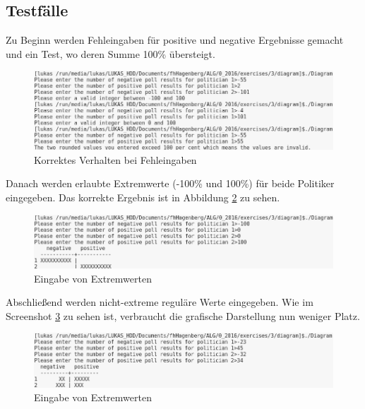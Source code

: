 \documentclass[a4paper]{article}
\begin{document}
\begin{enumerate}
		\section*{Testfälle}
		Zu Beginn werden Fehleingaben für positive und negative Ergebnisse gemacht und ein Test, wo deren Summe 100\% übersteigt.
		\begin{center}
			\begin{figure}[ht!]
				\includegraphics[scale=0.40]{diagram/tests/invalidInputs.png}
				\caption{Korrektes Verhalten bei Fehleingaben}
				\label{diagramInvalidInputs}
			\end{figure}
		\end{center}
		
		\clearpage
		Danach werden erlaubte Extremwerte (-100\% und 100\%) für beide Politiker eingegeben. Das korrekte Ergebnis ist in Abbildung \ref{diagramExtremeValues} zu sehen.
		\begin{center}
			\begin{figure}[ht!]
				\includegraphics[scale=0.40]{diagram/tests/extremeValues.png}
				\caption{Eingabe von Extremwerten}
				\label{diagramExtremeValues}
			\end{figure}
		\end{center}
		
		Abschließend werden nicht-extreme reguläre Werte eingegeben. Wie im Screenshot \ref{diagramRegularValues} zu sehen ist, verbraucht die grafische Darstellung nun weniger Platz.
		
		\begin{center}
			\begin{figure}[ht!]
				\includegraphics[scale=0.40]{diagram/tests/regularValues.png}
				\caption{Eingabe von Extremwerten}
				\label{diagramRegularValues}
			\end{figure}
		\end{center}
		

\end{enumerate}
\end{document}
